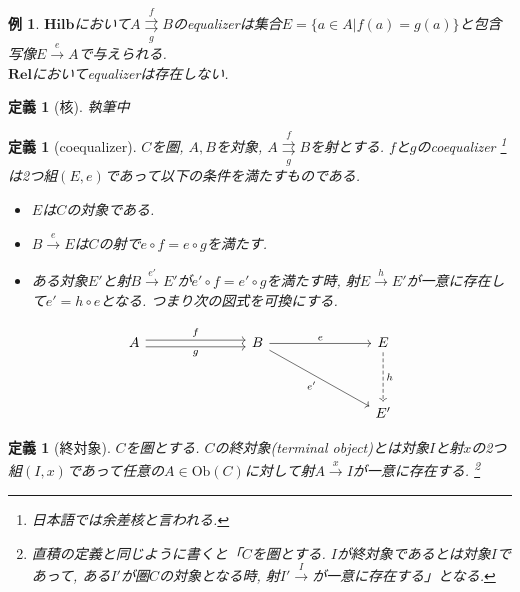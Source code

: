 \documentclass[a4paper,12pt]{ltjsarticle}
\theoremstyle{break}
\newtheorem{defn}[thm]{定義}
\newtheorem{eg}[thm]{例}
\newcommand{\rel}{\mathbf{Rel}}
\newcommand{\hilb}{\mathbf{Hilb}}
\newcommand{\Ob}{\mathrm{Ob}}
\newcommand{\xr}[1]{\xrightarrow{#1}}
\newcommand{\ci}{\circ}
\numberwithin{equation}{section}
\begin{document}
\begin{eg}
  $\hilb$において$A \overset{f}{\underset{g}{\rightrightarrows}} B$のequalizerは集合$E=\{ a \in A | f(a)=g(a) \}$と包含写像$E \xr{e} A$で与えられる. \\
  $\rel$においてequalizerは存在しない. 
\end{eg}  

\begin{defn}[核]
  執筆中
\end{defn}

\begin{defn}[coequalizer]
  $C$を圏, $A, B$を対象, $A \overset{f}{\underset{g}{\rightrightarrows}} B$を射とする. 
  $f$と$g$のcoequalizer
  \footnote{
    日本語では余差核と言われる.
    }
  は2つ組$(E, e)$であって以下の条件を満たすものである. 
  \begin{itemize}
    \item $E$は$C$の対象である. 
    \item $B \xr{e} E$は$C$の射で$e \ci f = e \ci g$を満たす. 
    \item ある対象$E'$と射$B \xr{e'} E'$が$e' \ci f = e' \ci g$を満たす時, 射$E \xr{h} E'$が一意に存在して$e' = h \ci e$となる. 
    つまり次の図式を可換にする. 
  \end{itemize}
  \[\begin{tikzcd}
    A &&& B &&& E \\
    \\
    &&&&&& {E'}
    \arrow["g"', shift right=1, from=1-1, to=1-4]
    \arrow["e", from=1-4, to=1-7]
    \arrow["h", dashed, from=1-7, to=3-7]
    \arrow["{e'}"', from=1-4, to=3-7]
    \arrow["f", shift left=1, from=1-1, to=1-4]
  \end{tikzcd}\]  
\end{defn}

\begin{defn}[終対象]
  $C$を圏とする. 
  $C$の終対象(terminal object)とは対象$I$と射$x$の2つ組$(I,x)$であって任意の$A \in \Ob(C)$に対して射$A \xr{x} I$が一意に存在する.
  \footnote{
  直積の定義と同じように書くと「$C$を圏とする. 
  $I$が終対象であるとは対象$I$であって, ある$I'$が圏$C$の対象となる時, 射$I' \xr I$が一意に存在する」となる. 
  } 
\end{defn}
\end{document}
